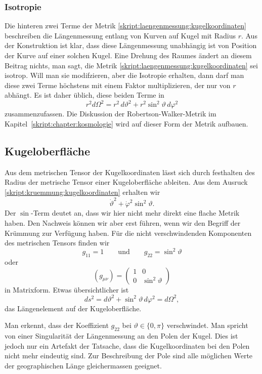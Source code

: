 \subsubsection{Isotropie}
Die hinteren zwei Terme der Metrik
\eqref{skript:laengenmessung:kugelkoordinaten}
beschreiben die Längenmessung entlang von Kurven auf Kugel mit Radius $r$.
Aus der Konstruktion ist klar, dass diese Längenmessung unabhängig ist
von Position der Kurve auf einer solchen Kugel.
Eine Drehung des Raumes ändert an diesem Beitrag nichts, man sagt, die
Metrik \eqref{skript:laengenmessung:kugelkoordinaten} sei isotrop.
%
Will man sie modifzieren, aber die Isotropie erhalten, dann darf man
diese zwei Terme höchstens mit einem Faktor multiplizieren, der nur von $r$
abhängt.
Es ist daher üblich, diese beiden Terme in
\begin{equation}
r^2 d\Omega^2
=
r^2\,d\vartheta^2 + r^2\sin^2\vartheta\,d\varphi^2
\label{skript:laengenmessung:omega2}
\end{equation}
zusammenzufassen.
Die Diskussion der Robertson-Walker-Metrik im
Kapitel~\ref{skript:chapter:kosmologie} wird auf dieser Form der Metrik
aufbauen.

\subsection{Kugeloberfläche}
Aus dem metrischen Tensor der Kugelkoordinaten lässt sich durch festhalten
des Radius der metrische Tensor einer Kugeloberfläche ableiten.
Aus dem Ausruck \eqref{skript:kruemmung:kugelkoordinaten}
erhalten wir
\[
\dot\vartheta^2+\dot\varphi^2\sin^2\vartheta.
\]
Der $\sin$-Term deutet an, dass wir hier nicht mehr direkt eine flache
Metrik haben.
Den Nachweis können wir aber erst führen, wenn wir den Begriff der
Krümmung zur Verfügung haben.
Für die nicht verschwindenden Komponenten des metrischen Tensors
finden wir
\[
g_{11} = 1
\qquad\text{und}\qquad
g_{22}=\sin^2\vartheta
\]
oder
\[
(g_{\mu\nu})
=
\begin{pmatrix}
1&0\\
0&\sin^2\vartheta
\end{pmatrix}
\]
in Matrixform.
Etwas übersichtlicher ist 
\begin{equation}
ds^2
=
d\vartheta^2 + \sin^2\vartheta\,d\varphi^2
=
d\Omega^2,
\label{skript:laengenmessung:kugeloberflaeche}
\end{equation}
das Längenelement auf der Kugeloberfläche.
%

Man erkennt, dass der Koeffizient $g_{22}$ bei $\vartheta \in\{0,\pi\}$
verschwindet.
Man spricht von einer Singularität der Längenmessung an den Polen der Kugel.
Dies ist jedoch nur ein Artefakt der Tatsache, dass die Kugelkoordinaten
bei den Polen nicht mehr eindeutig sind.
Zur Beschreibung der Pole sind alle möglichen Werte der geographischen
Länge gleichermassen geeignet.

